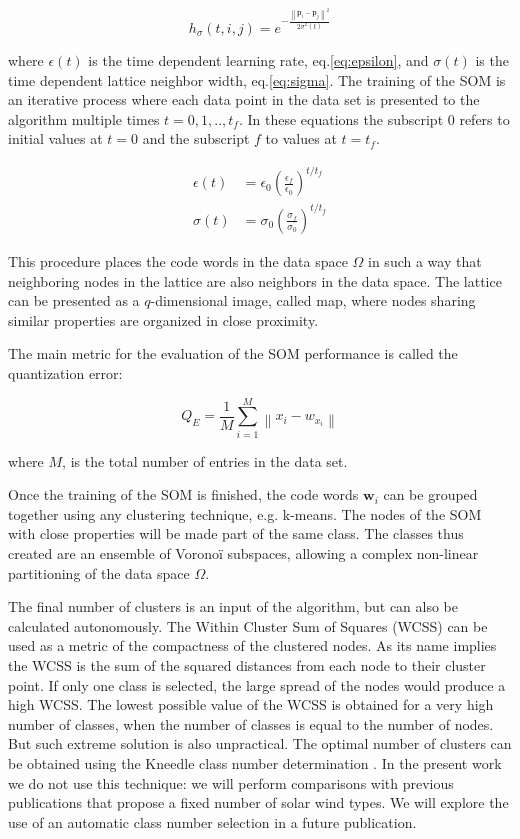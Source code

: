 \documentclass[utf8]{frontiersSCNS} %
\begin{document}
\begin{equation}
h_\sigma(t,i,j) = e^{-\frac{\left\lVert \boldsymbol{p}_i - \boldsymbol{p}_j \right\rVert^2}{2\sigma^2(t)}} \label{eq:neigsom}
\end{equation}

where $\epsilon(t)$ is the time dependent learning rate, eq.\eqref{eq:epsilon}, and $\sigma(t)$ is the time dependent lattice neighbor width, eq.\eqref{eq:sigma}. The training of the SOM is an iterative process where each data point in the data set is presented to the algorithm multiple times $t={0, 1,..,t_f}$. In these equations the subscript $0$ refers to initial values at $t=0$ and the subscript $f$ to values at $t=t_f$.

\begin{align}
\epsilon(t) & = \epsilon_0 \left(\frac{\epsilon_f}{\epsilon_0}\right)^{t/t_f} \label{eq:epsilon} \\
\sigma(t) & = \sigma_0 \left(\frac{\sigma_f}{\sigma_0}\right)^{t/t_f} \label{eq:sigma}
\end{align}

This procedure places the code words in the data space $\Omega$ in such a way that neighboring nodes in the lattice are also neighbors in the data space. The lattice can be presented as a $q$-dimensional image, called map, where nodes sharing similar properties are organized in close proximity.

The main metric for the evaluation of the SOM performance is called the quantization error:

\begin{equation}
Q_E = \frac{1}{M} \sum_{i=1}^M \left\lVert x_i - w_{x_i} \right\rVert
\end{equation}

where $M$, is the total number of entries in the data set.

Once the training of the SOM is finished, the code words $\boldsymbol{w}_i$ can be grouped together using any clustering technique, e.g. k-means. The nodes of the SOM with close properties will be made part of the same class. The classes thus created are an ensemble of Vorono\"i subspaces, allowing a complex non-linear partitioning of the data space $\Omega$.

The final number of clusters is an input of the algorithm, but can also be calculated autonomously. The Within Cluster Sum of Squares (WCSS) can be used as a metric of the compactness of the clustered nodes. As its name implies the WCSS is the sum of the squared distances from each node to their cluster point. If only one class is selected, the large spread of the nodes would produce a high WCSS. The lowest possible value of the WCSS is obtained for a very high number of classes, when the number of classes is equal to the number of nodes. But such extreme solution is also unpractical. The optimal number of clusters can be obtained using the Kneedle class number determination \citep{5961514}. In the present work we do not use this technique: we will perform comparisons with previous publications that propose a fixed number of solar wind types. We will explore the use of an automatic class number selection in a future publication.
\end{document}
